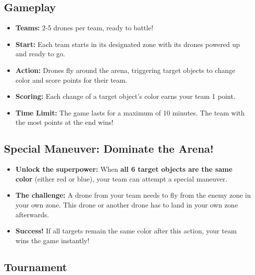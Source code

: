 \subsection{Gameplay}

\begin{itemize}
	\item \textbf{Teams:} 2-5 drones per team, ready to battle!
	\item \textbf{Start:} Each team starts in its designated zone with its drones powered up and ready to go.
	\item \textbf{Action:} Drones fly around the arena, triggering target objects to change color and score points for their team.
	\item \textbf{Scoring:} Each change of a target object's color earns your team 1 point.
	\item \textbf{Time Limit:} The game lasts for a maximum of 10 minutes. The team with the most points at the end wins!
\end{itemize}


\subsection{Special Maneuver: Dominate the Arena!}

\begin{itemize}
	\item \textbf{Unlock the superpower:} When \textbf{all 6 target objects are the same color} (either red or blue), your team can attempt a special maneuver.
	\item \textbf{The challenge:} A drone from your team needs to fly from the enemy zone in your own zone. This drone or another drone has to land in your own zone afterwards.
	\item \textbf{Success!} If all targets remain the same color after this action, your team wins the game instantly!
\end{itemize}

\subsection{Tournament}

